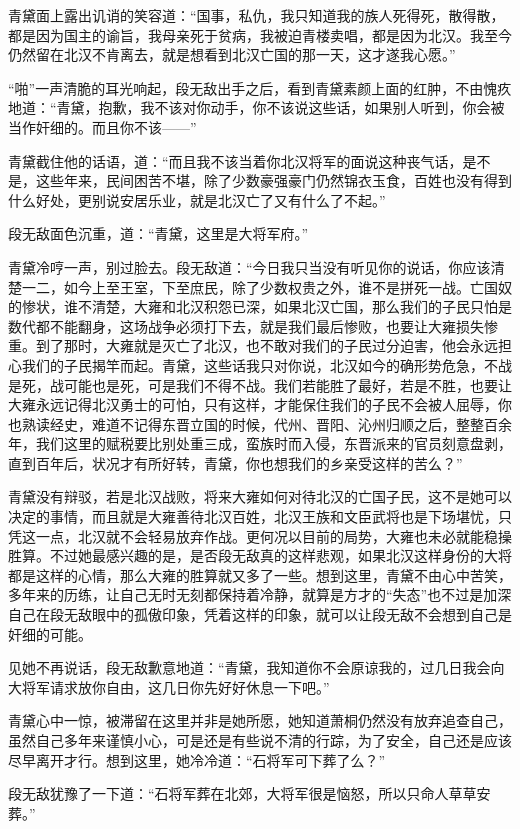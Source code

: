 青黛面上露出讥诮的笑容道：“国事，私仇，我只知道我的族人死得死，散得散，都是因为国主的谕旨，我母亲死于贫病，我被迫青楼卖唱，都是因为北汉。我至今仍然留在北汉不肯离去，就是想看到北汉亡国的那一天，这才遂我心愿。”

“啪”一声清脆的耳光响起，段无敌出手之后，看到青黛素颜上面的红肿，不由愧疚地道：“青黛，抱歉，我不该对你动手，你不该说这些话，如果别人听到，你会被当作奸细的。而且你不该——”

青黛截住他的话语，道：“而且我不该当着你北汉将军的面说这种丧气话，是不是，这些年来，民间困苦不堪，除了少数豪强豪门仍然锦衣玉食，百姓也没有得到什么好处，更别说安居乐业，就是北汉亡了又有什么了不起。”

段无敌面色沉重，道：“青黛，这里是大将军府。”

青黛冷哼一声，别过脸去。段无敌道：“今日我只当没有听见你的说话，你应该清楚一二，如今上至王室，下至庶民，除了少数权贵之外，谁不是拼死一战。亡国奴的惨状，谁不清楚，大雍和北汉积怨已深，如果北汉亡国，那么我们的子民只怕是数代都不能翻身，这场战争必须打下去，就是我们最后惨败，也要让大雍损失惨重。到了那时，大雍就是灭亡了北汉，也不敢对我们的子民过分迫害，他会永远担心我们的子民揭竿而起。青黛，这些话我只对你说，北汉如今的确形势危急，不战是死，战可能也是死，可是我们不得不战。我们若能胜了最好，若是不胜，也要让大雍永远记得北汉勇士的可怕，只有这样，才能保住我们的子民不会被人屈辱，你也熟读经史，难道不记得东晋立国的时候，代州、晋阳、沁州归顺之后，整整百余年，我们这里的赋税要比别处重三成，蛮族时而入侵，东晋派来的官员刻意盘剥，直到百年后，状况才有所好转，青黛，你也想我们的乡亲受这样的苦么？”

青黛没有辩驳，若是北汉战败，将来大雍如何对待北汉的亡国子民，这不是她可以决定的事情，而且就是大雍善待北汉百姓，北汉王族和文臣武将也是下场堪忧，只凭这一点，北汉就不会轻易放弃作战。更何况以目前的局势，大雍也未必就能稳操胜算。不过她最感兴趣的是，是否段无敌真的这样悲观，如果北汉这样身份的大将都是这样的心情，那么大雍的胜算就又多了一些。想到这里，青黛不由心中苦笑，多年来的历练，让自己无时无刻都保持着冷静，就算是方才的“失态”也不过是加深自己在段无敌眼中的孤傲印象，凭着这样的印象，就可以让段无敌不会想到自己是奸细的可能。

见她不再说话，段无敌歉意地道：“青黛，我知道你不会原谅我的，过几日我会向大将军请求放你自由，这几日你先好好休息一下吧。”

青黛心中一惊，被滞留在这里并非是她所愿，她知道萧桐仍然没有放弃追查自己，虽然自己多年来谨慎小心，可是还是有些说不清的行踪，为了安全，自己还是应该尽早离开才行。想到这里，她冷冷道：“石将军可下葬了么？”

段无敌犹豫了一下道：“石将军葬在北郊，大将军很是恼怒，所以只命人草草安葬。”

